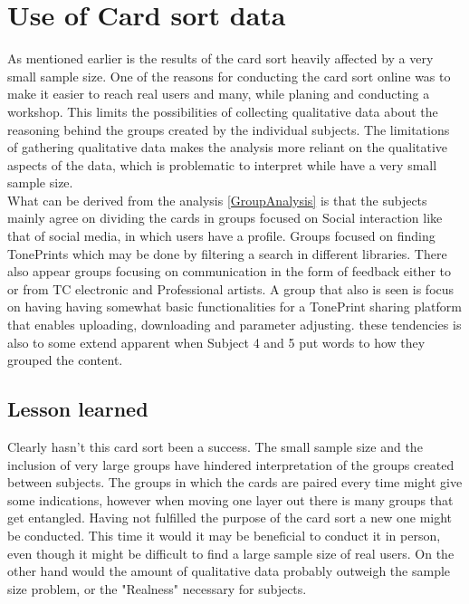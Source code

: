 



\section{Use of Card sort data}
\label{UseOfCardSortData}
%
As mentioned earlier is the results of the card sort heavily affected by a very small sample size. One of the reasons for conducting the card sort online was to make it easier to reach real users and many, while planing and conducting a workshop. This limits the possibilities of collecting qualitative data about the reasoning behind the groups created by the individual subjects. The limitations of gathering qualitative data makes the analysis more reliant on the qualitative aspects of the data, which is problematic to interpret while have a very small sample size. \\
What can be derived from the analysis \autoref{GroupAnalysis} is that the subjects mainly agree on dividing the cards in groups focused on Social interaction like that of social media, in which users have a profile. Groups focused on finding TonePrints which may be done by filtering a search in different libraries. There also appear groups focusing on communication in the form of feedback either to or from TC electronic and Professional artists. A group that also is seen is focus on having having somewhat basic functionalities for a TonePrint sharing platform that enables uploading, downloading and parameter adjusting. these tendencies is also to some extend apparent when Subject 4 and 5 put words to how they grouped the content.\\

\subsection{Lesson learned}
\label{LessonLearned}
Clearly hasn't this card sort been a success. The small sample size and the inclusion of very large groups have hindered interpretation of the groups created between subjects. The groups in which the cards are paired every time might give some indications, however when moving one layer out there is many groups that get entangled. Having not fulfilled the purpose of the card sort a new one might be conducted. This time it would it may be beneficial to conduct it in person, even though it might be difficult to find a large sample size of real users. On the other hand would the amount of qualitative data probably outweigh the sample size problem, or the "Realness" necessary for subjects. 







